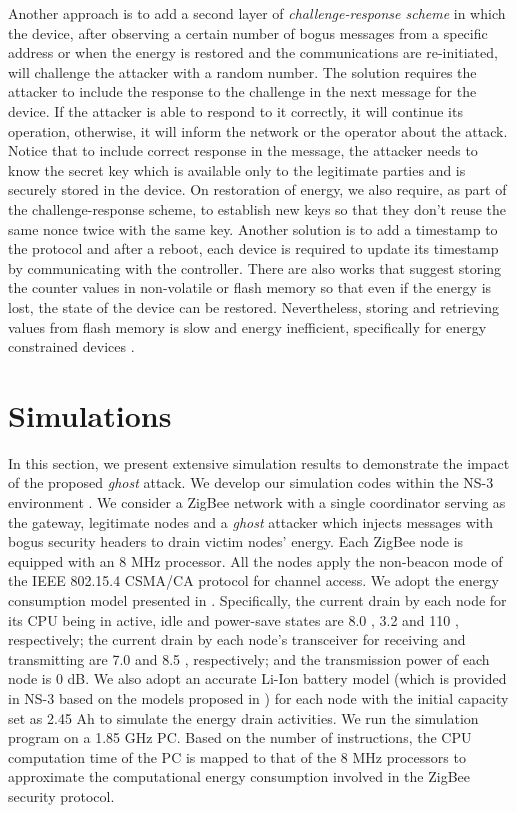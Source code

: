\documentclass[10pt,journal,cspaper,compsoc]{IEEEtran}
\begin{document}
Another approach is to add a second layer of {\em challenge-response scheme} in which the device, after observing a certain number of bogus messages from a specific address or when the energy is restored and the communications are re-initiated, will challenge the attacker with a random number. The solution requires the attacker to include the response to the challenge in the next message for the device. If the attacker is able to respond to  it correctly, it will continue its operation, otherwise, it will inform the network or the operator about the attack. Notice that to include correct response in the message, the attacker needs to know the secret key which is available only to the legitimate parties and is securely stored in the device. On restoration of energy, we also require, as part of the challenge-response scheme,  to establish new keys so that they don't reuse the same nonce twice with the same key. Another solution is to add a timestamp to the protocol and after a reboot, each device is required to update its timestamp by communicating with the controller. There are also works that suggest storing the counter values in non-volatile or flash memory so that even if the energy is lost, the state of the device can be restored. Nevertheless, storing and retrieving values from flash memory is slow and energy inefficient, specifically for energy constrained devices \cite{Sastry}.


\section{Simulations}\label{simulation}
In this section, we present extensive simulation results to demonstrate the impact of the proposed {\em ghost} attack. We develop our simulation codes within the NS-3 environment \cite{NS3}. We consider a ZigBee network with a single coordinator serving as the gateway,  legitimate nodes and a {\em ghost} attacker which injects messages with bogus security headers to drain victim nodes' energy. Each ZigBee node is equipped with an 8 MHz processor. All the nodes apply the non-beacon mode of the IEEE 802.15.4 CSMA/CA protocol for channel access. We adopt the energy consumption model presented in \cite{energymodel}. Specifically, the current drain by each node for its CPU being in active, idle and power-save states are 8.0 , 3.2  and 110 , respectively; the current drain by each node's transceiver for receiving and transmitting are 7.0  and 8.5 , respectively; and the transmission power of each node is 0 dB. We also adopt an accurate Li-Ion battery model (which is provided in NS-3 based on the models proposed in \cite{batterymodel1,batterymodel2}) for each node with the initial capacity set as 2.45 Ah to simulate the energy drain activities. We run the simulation program on a 1.85 GHz PC. Based on the number of instructions, the CPU computation time of the PC is mapped to that of the 8 MHz processors to approximate the computational energy consumption involved in the ZigBee security protocol.
\end{document}
